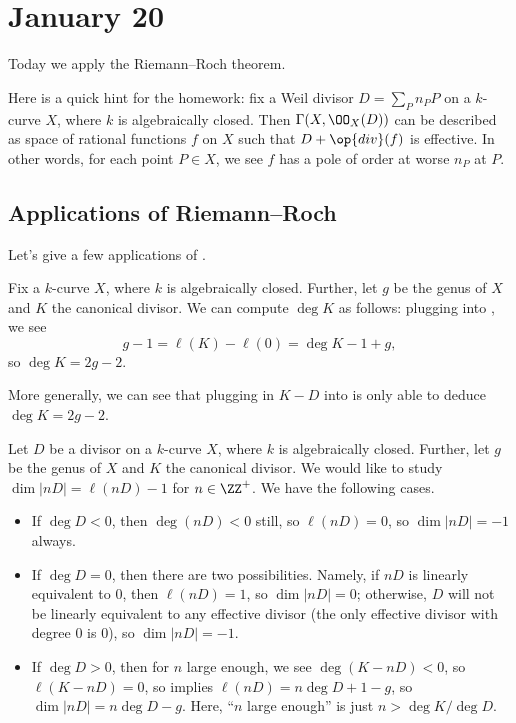 \documentclass[../notes.tex]{subfiles}
\begin{document}
\section{January 20}

Today we apply the Riemann--Roch theorem.
\begin{remark}
	Here is a quick hint for the homework: fix a Weil divisor $D=\sum_Pn_PP$ on a $k$-curve $X$, where $k$ is algebraically closed. Then $\Gamma(X,\OO_X(D))$ can be described as space of rational functions $f$ on $X$ such that $D+\op{div}(f)$ is effective. In other words, for each point $P\in X$, we see $f$ has a pole of order at worse $n_P$ at $P$.
\end{remark}

\subsection{Applications of Riemann--Roch}
Let's give a few applications of .
\begin{example} \label{ex:compute-deg-k}
	Fix a $k$-curve $X$, where $k$ is algebraically closed. Further, let $g$ be the genus of $X$ and $K$ the canonical divisor. We can compute $\deg K$ as follows: plugging into , we see
	\[g-1=\ell(K)-\ell(0)=\deg K-1+g,\]
	so $\deg K=2g-2$.
\end{example}
\begin{remark}
	More generally, we can see that plugging in $K-D$ into  is only able to deduce $\deg K=2g-2$.
\end{remark}
\begin{example}
	Let $D$ be a divisor on a $k$-curve $X$, where $k$ is algebraically closed. Further, let $g$ be the genus of $X$ and $K$ the canonical divisor. We would like to study $\dim|nD|=\ell(nD)-1$ for $n\in\ZZ^+$. We have the following cases.
	\begin{itemize}
		\item If $\deg D<0$, then $\deg(nD)<0$ still, so $\ell(nD)=0$, so $\dim|nD|=-1$ always.
		\item If $\deg D=0$, then there are two possibilities. Namely, if $nD$ is linearly equivalent to $0$, then $\ell(nD)=1$, so $\dim|nD|=0$; otherwise, $D$ will not be linearly equivalent to any effective divisor (the only effective divisor with degree $0$ is $0$), so $\dim|nD|=-1$.
		\item If $\deg D>0$, then for $n$ large enough, we see $\deg(K-nD)<0$, so $\ell(K-nD)=0$, so  implies $\ell(nD)=n\deg D+1-g$, so $\dim|nD|=n\deg D-g$. Here, ``$n$ large enough'' is just $n>\deg K/\deg D$.
	\end{itemize}
\end{example}
\end{document}
